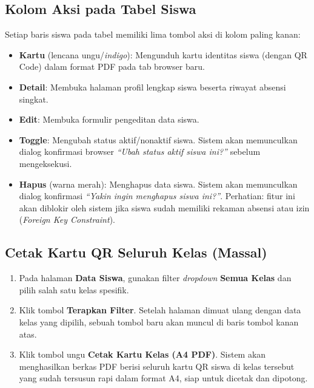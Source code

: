 \subsection{Kolom Aksi pada Tabel Siswa}
Setiap baris siswa pada tabel memiliki lima tombol aksi di kolom paling kanan:
\begin{itemize}
    \item \textbf{Kartu} (lencana ungu/\textit{indigo}): Mengunduh kartu identitas siswa (dengan QR Code) dalam format PDF pada tab browser baru.
    \item \textbf{Detail}: Membuka halaman profil lengkap siswa beserta riwayat absensi singkat.
    \item \textbf{Edit}: Membuka formulir pengeditan data siswa.
    \item \textbf{Toggle}: Mengubah status aktif/nonaktif siswa. Sistem akan memunculkan dialog konfirmasi browser \textit{``Ubah status aktif siswa ini?''} sebelum mengeksekusi.
    \item \textbf{Hapus} (warna merah): Menghapus data siswa. Sistem akan memunculkan dialog konfirmasi \textit{``Yakin ingin menghapus siswa ini?''}. Perhatian: fitur ini akan diblokir oleh sistem jika siswa sudah memiliki rekaman absensi atau izin (\textit{Foreign Key Constraint}).
\end{itemize}

\subsection{Cetak Kartu QR Seluruh Kelas (Massal)}
\begin{enumerate}
    \item Pada halaman \textbf{Data Siswa}, gunakan filter \textit{dropdown} \textbf{Semua Kelas} dan pilih salah satu kelas spesifik.
    \item Klik tombol \textbf{Terapkan Filter}. Setelah halaman dimuat ulang dengan data kelas yang dipilih, sebuah tombol baru akan muncul di baris tombol kanan atas.
    \item Klik tombol ungu \textbf{Cetak Kartu Kelas (A4 PDF)}. Sistem akan menghasilkan berkas PDF berisi seluruh kartu QR siswa di kelas tersebut yang sudah tersusun rapi dalam format A4, siap untuk dicetak dan dipotong.
\end{enumerate}

